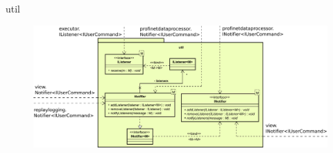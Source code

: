 \begin{frame}{util}
  \begin{figure}
    \centering
    \includegraphics[width=\textwidth]{./images/util.png}
  \end{figure}
\end{frame}
